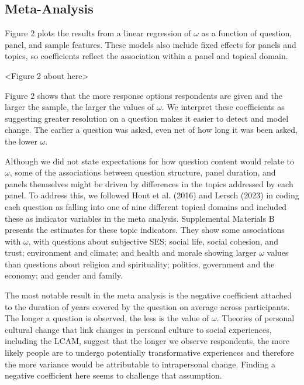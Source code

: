 \documentclass[
  12pt,
]{article}
\begin{document}
\hypertarget{meta-analysis}{%
\subsection{Meta-Analysis}\label{meta-analysis}}

Figure 2 plots the results from a linear regression of \(\omega\) as a
function of question, panel, and sample features. These models also
include fixed effects for panels and topics, so coefficients reflect the
association within a panel and topical domain.

\begin{center}
<Figure 2 about here>
\end{center}

Figure 2 shows that the more response options respondents are given and
the larger the sample, the larger the values of \(\omega\). We interpret
these coefficients as suggesting greater resolution on a question makes
it easier to detect and model change. The earlier a question was asked,
even net of how long it was been asked, the lower \(\omega\).

Although we did not state expectations for how question content would
relate to \(\omega\), some of the associations between question
structure, panel duration, and panels themselves might be driven by
differences in the topics addressed by each panel. To address this, we
followed Hout et al. (2016) and Lersch (2023) in coding each question as
falling into one of nine different topical domains and included these as
indicator variables in the meta analysis. Supplemental Materials B
presents the estimates for these topic indicators. They show some
associations with \(\omega\), with questions about subjective SES;
social life, social cohesion, and trust; environment and climate; and
health and morale showing larger \(\omega\) values than questions about
religion and spirituality; politics, government and the economy; and
gender and family.

The most notable result in the meta analysis is the negative coefficient
attached to the duration of years covered by the question on average
across participants. The longer a question is observed, the less is the
value of \(\omega\). Theories of personal cultural change that link
changes in personal culture to social experiences, including the LCAM,
suggest that the longer we observe respondents, the more likely people
are to undergo potentially transformative experiences and therefore the
more variance would be attributable to intrapersonal change. Finding a
negative coefficient here seems to challenge that assumption.
\end{document}
